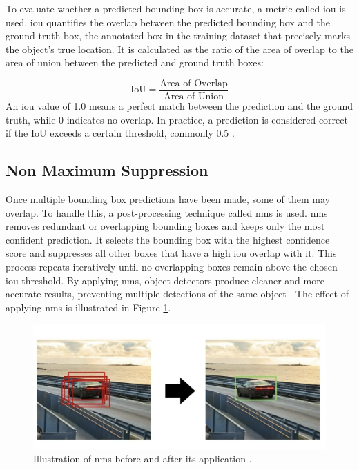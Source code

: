 To evaluate whether a predicted bounding box is accurate, a metric called \gls{iou} is used. \gls{iou} quantifies the overlap between the predicted bounding box and the ground truth box, the annotated box in the training dataset that precisely marks the object's true location. It is calculated as the ratio of the area of overlap to the area of union between the predicted and ground truth boxes:

\[
\text{IoU} = \frac{\text{Area of Overlap}}{\text{Area of Union}}
\]
An \gls{iou} value of 1.0 means a perfect match between the prediction and the ground truth, while 0 indicates no overlap. In practice, a prediction is considered correct if the IoU exceeds a certain threshold, commonly 0.5 \cite{ultralytics:iou}. \\

\subsection{Non Maximum Suppression}

 Once multiple bounding box predictions have been made, some of them may overlap. To handle this, a post-processing technique called \gls{nms} is used. \gls{nms} removes redundant or overlapping bounding boxes and keeps only the most confident prediction. It selects the bounding box with the highest confidence score and suppresses all other boxes that have a high \gls{iou} overlap with it. This process repeats iteratively until no overlapping boxes remain above the chosen \gls{iou} threshold. By applying \gls{nms}, object detectors produce cleaner and more accurate results, preventing multiple detections of the same object
\cite{thepythoncode:nms}. The effect of applying \gls{nms} is illustrated in Figure \ref{fig:nms}.

\begin{figure}[h!]
    \centering
    \includegraphics[width=0.75\linewidth]{figures/theory/image-recognition/nms.png}
    \caption[NMS before and after]{Illustration of \gls{nms} before and after its application \cite{thepythoncode:nms}.}
    \label{fig:nms}
\end{figure}

